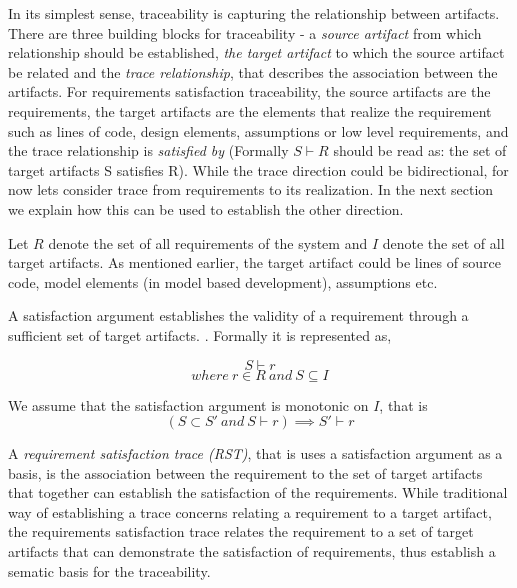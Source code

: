In its simplest sense, traceability is capturing the relationship between artifacts. There are three building blocks for traceability - a \emph{source artifact} from which relationship should be established, \emph{the target artifact} to which the source artifact be related and the \emph{trace relationship}, that describes the association between the artifacts. For requirements satisfaction traceability, the source artifacts are the requirements, the target artifacts are the elements that realize the requirement such as lines of code, design elements, assumptions or low level requirements, and the trace relationship is \emph{satisfied by} (Formally $S \vdash R$ should be read as: the set of target artifacts S satisfies R). While the trace direction could be bidirectional, for now lets consider trace from requirements to its realization. In the next section we explain how this can be used to establish the other direction.

Let $R$ denote the set of all requirements of the system %
and $I$ denote the set of all target artifacts. %
As mentioned earlier, the target artifact could be lines of source code, model elements (in model based development), assumptions etc. %

A satisfaction argument establishes the validity of a requirement through a sufficient set of target artifacts. . Formally it is represented as,

$$ S \vdash r $$
$$ where~r \in R~and~S\subseteq I$$

We assume that the satisfaction argument  is monotonic on $I$, that is
$$ (S \subset S' ~and~ S \vdash r) \implies S' \vdash r$$



A \emph{requirement satisfaction trace (RST)}, that is uses a satisfaction argument as a basis, is the association between the requirement to the set of target artifacts that together can establish the satisfaction of the requirements. While traditional way of establishing a trace concerns relating a requirement to a target artifact, the requirements satisfaction trace relates the requirement to a set of target artifacts that can demonstrate the satisfaction of requirements, thus establish a sematic basis for the traceability.

